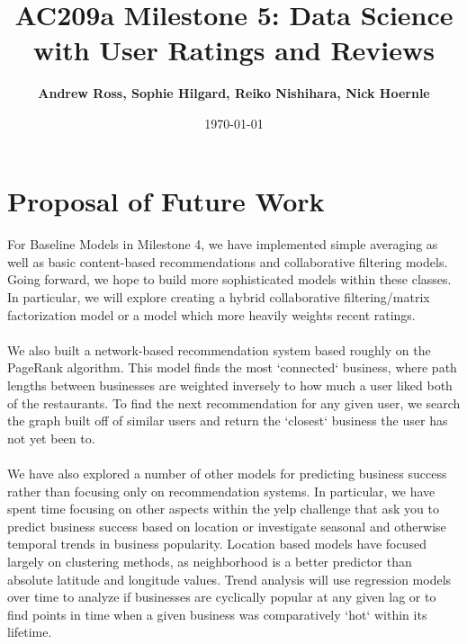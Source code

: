 \documentclass[11pt]{article}
\title{
\vspace{1cm}
\textmd{\textbf{AC209a Milestone 5: Data Science with User Ratings and Reviews}}\\
}
\author{\textbf{Andrew Ross, Sophie Hilgard, Reiko Nishihara, Nick Hoernle}}
\date{\today} %
\begin{document}
\maketitle

\section*{Proposal of Future Work}
\paragraph{} 	For Baseline Models in Milestone 4, we have implemented simple averaging as well as basic content-based recommendations and collaborative filtering models. Going forward, we hope to build more sophisticated models within these classes. In particular, we will explore creating a hybrid collaborative filtering/matrix factorization model or a model which more heavily weights recent ratings.
\paragraph{}	We also built a network-based recommendation system based roughly on the PageRank algorithm. This model finds the most `connected` business, where path lengths between businesses are weighted inversely to how much a user liked both of the restaurants. To find the next recommendation for any given user, we search the graph built off of similar users and return the `closest` business the user has not yet been to.
\paragraph{}	We have also explored a number of other models for predicting business success rather than focusing only on recommendation systems. In particular, we have spent time focusing on other aspects within the yelp challenge that ask you to predict business success based on location or investigate seasonal and otherwise temporal trends in business popularity. Location based models have focused largely on clustering methods, as neighborhood is a better predictor than absolute latitude and longitude values. Trend analysis will use regression models over time to analyze if businesses are cyclically  popular at any given lag or to find points in time when a given business was comparatively `hot` within its lifetime.
\end{document}
